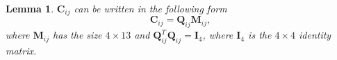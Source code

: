\documentclass{vgtc}                          %
\newtheorem{lemma}{Lemma}
\begin{document}
\begin{lemma} \label{lemma_C_ij}
	$\mathbf{C}_{ij}$ can be written in the following form 
	\begin{equation} \label{equ_qr}
	\mathbf{C}_{ij} = \mathbf{Q}_{ij}\mathbf{M}_{ij},
	\end{equation}
	where  $\mathbf{M}_{ij}$  has the size $4 \times 13$ and $\mathbf{Q}_{ij}^{T}\mathbf{Q}_{ij} = \mathbf{I}_{4}$, where $\mathbf{I}_{4}$ is the $4 \times 4 $ identity matrix.
\end{lemma}
\end{document}
